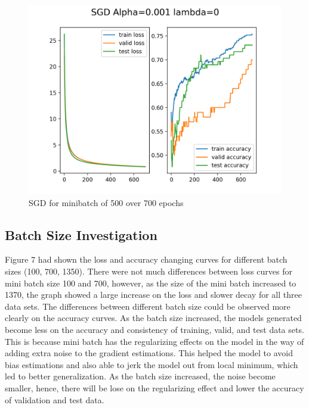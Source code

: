 \documentclass[10pt,letterpaper]{article}
\begin{document}


\begin{figure}[H]
\centering
 \begin{subfig}
  \includegraphics[width=.5\linewidth]{SGD_MSE.png}
  \caption{SGD for minibatch of 500 over 700 epochs}
  \end{subfig}
\end{figure}

\subsection{Batch Size Investigation}

\qquad Figure 7 had shown the loss and accuracy changing curves for different batch sizes (100, 700, 1350). There were not much differences between loss curves for mini batch size 100 and 700, however, as the size of the mini batch increased to 1370, the graph showed a large increase on the loss and slower decay for all three data sets. The differences between different batch size could be observed more clearly on the accuracy curves. As the batch size increased, the models generated become less on the accuracy and consistency of training, valid, and test data sets. This is because mini batch has the regularizing effects on the model in the way of adding extra noise to the gradient estimations. This helped the model to avoid bias estimations and also able to jerk the model out from local minimum, which led to better generalization. As the batch size increased, the noise become smaller, hence, there will be lose on the regularizing effect and lower the accuracy of validation and test data. \\
\end{document}
